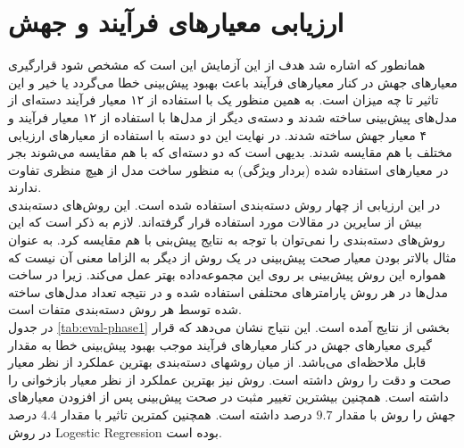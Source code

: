 \section{ارزیابی معیارهای فرآیند و جهش}
همانطور که اشاره شد هدف از این آزمایش این است که مشخص شود قرارگیری معیارهای جهش در کنار معیارهای فرآیند باعث بهبود پیش‌بینی خطا می‌گردد یا خیر و این تاثیر تا چه میزان است. به همین منظور یک با استفاده از ۱۲ معیار فرآیند دسته‌ای از مدل‌های پیش‌بینی ساخته شدند و دسته‌ی دیگر از مدل‌ها با استفاده از ۱۲ معیار فرآیند و ۴ معیار جهش ساخته شدند. در نهایت این دو دسته با استفاده از معیارهای ارزیابی مختلف با هم مقایسه شدند. بدیهی است که دو دسته‌ای که با هم مقایسه می‌شوند بجر در معیارهای استفاده شده (بردار ویژگی) به منظور ساخت مدل از هیچ منظری تفاوت ندارند. \\
در این ارزیابی از چهار روش دسته‌بندی استفاده شده است. این روش‌های دسته‌بندی بیش از سایرین در مقالات مورد استفاده قرار گرفته‌اند. لازم به ذکر است که این روش‌های دسته‌بندی را نمی‌توان با توجه به نتایج پیش‌بنی با هم مقایسه کرد. به عنوان مثال بالاتر بودن معیار صحت پیش‌بینی در یک روش از دیگر به الزاما معنی آن نیست که همواره این روش پیش‌بینی بر روی این مجموعه‌داده بهتر عمل می‌کند. زیرا در ساخت مدل‌ها در هر روش پارامترهای محتلفی استفاده شده و در نتیجه تعداد مدل‌های ساخته شده توسط هر روش دسته‌بندی متفات است.\\
در جدول \ref{tab:eval-phase1} بخشی از نتایج آمده است. این نتیاج نشان می‌دهد که قرار گیری معیارهای جهش در کنار معیارهای فرآیند موجب بهبود پیش‌بینی خطا به مقدار قابل ملاحظه‌ای می‌باشد. از میان روشهای دسته‌بندی بهترین عملکرد از نظر معیار صحت و دقت را روش  داشته است. روش  نیز بهترین عملکرد از نظر معیار بازخوانی را داشته است. همچنین بیشترین تغییر مثبت در صحت پیش‌بینی پس از افزودن معیارهای جهش را روش   با مقدار $9.7$ درصد داشته است. همچنین کمترین تاثیر با مقدار $4.4$ درصد در روش Logestic Regression بوده است.
